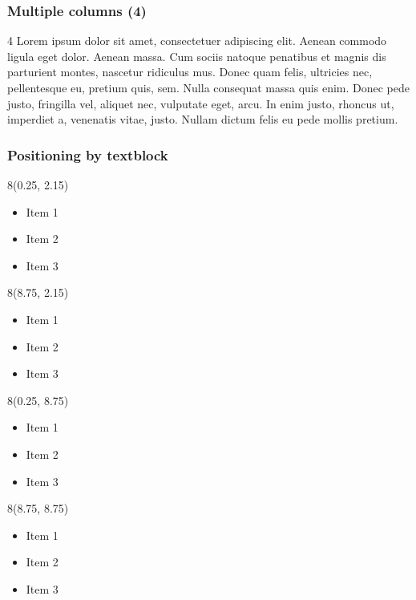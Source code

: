 \begin{frame}
\frametitle{Multiple columns (4)}
\setlength\columnsep{30pt}
\begin{multicols}{4}
\justifying
Lorem ipsum dolor sit amet, consectetuer adipiscing elit. Aenean commodo ligula eget dolor. Aenean massa. Cum sociis natoque penatibus et magnis dis parturient montes, nascetur ridiculus mus. Donec quam felis, ultricies nec, pellentesque eu, pretium quis, sem. Nulla consequat massa quis enim. Donec pede justo, fringilla vel, aliquet nec, vulputate eget, arcu. In enim justo, rhoncus ut, imperdiet a, venenatis vitae, justo. Nullam dictum felis eu pede mollis pretium.
\end{multicols}
\end{frame}

\begin{frame}
\frametitle{Positioning by textblock}
\vspace{-7 cm}
\begin{textblock}{8}(0.25, 2.15) %
\begin{itemize}
\item Item 1
\item Item 2
\item Item 3
\end{itemize}
\end{textblock}
\begin{textblock}{8}(8.75, 2.15) %
\begin{itemize}
\item Item 1
\item Item 2
\item Item 3
\end{itemize}
\end{textblock}
\begin{textblock}{8}(0.25, 8.75) %
\begin{itemize}
\item Item 1
\item Item 2
\item Item 3
\end{itemize}
\end{textblock}
\begin{textblock}{8}(8.75, 8.75) %
\begin{itemize}
\item Item 1
\item Item 2
\item Item 3
\end{itemize}
\end{textblock}
\end{frame}

